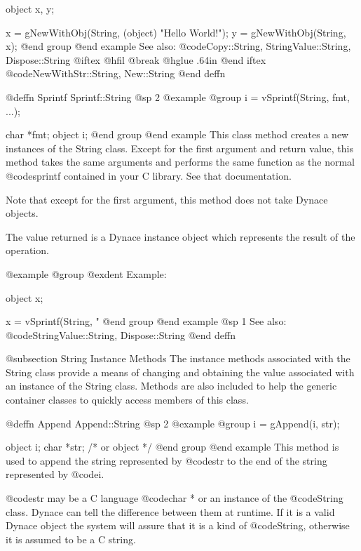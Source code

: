 object  x, y;

x = gNewWithObj(String, (object) "Hello World!");
y = gNewWithObj(String, x);
@end group
@end example
See also:  @code{Copy::String, StringValue::String, Dispose::String}
@iftex
@hfil @break @hglue .64in      
@end iftex
@code{NewWithStr::String, New::String}
@end deffn












@deffn {Sprintf} Sprintf::String
@sp 2
@example
@group
i = vSprintf(String, fmt, ...);

char    *fmt;
object  i;
@end group
@end example
This class method creates a new instances of the String class.  Except
for the first argument and return value, this method takes the same
arguments and performs the same function as the normal @code{sprintf}
contained in your C library.  See that documentation.

Note that except for the first argument, this method does not take
Dynace objects.

The value returned is a Dynace instance object which represents the result
of the operation.

@example
@group
@exdent Example:

object  x;

x = vSprintf(String, "%
@end group
@end example
@sp 1
See also:  @code{StringValue::String, Dispose::String}
@end deffn





@subsection String Instance Methods
The instance methods associated with the String class provide a
means of changing and obtaining the value associated with an instance of
the String class.  Methods are also included to help the generic
container classes to quickly access members of this class.








@deffn {Append} Append::String
@sp 2
@example
@group
i = gAppend(i, str);

object  i;
char    *str;  /*  or object  */
@end group
@end example
This method is used to append the string represented by @code{str}
to the end of the string represented by @code{i}.

@code{str} may be a C language @code{char *} or an instance of the
@code{String} class.  Dynace can tell the difference between them at
runtime.  If it is a valid Dynace object the system will assure that it is
a kind of @code{String}, otherwise it is assumed to be a C string.

